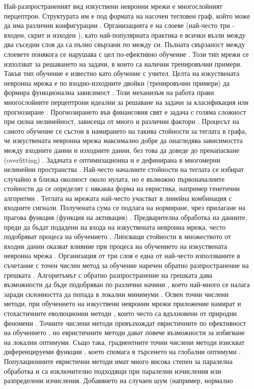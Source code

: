 Най-разпространеният вид изкуствени невронни мрежи е многослойният перцептрон. Структурата им е под формата на насочен тегловен граф, който може да има различни конфигурации \cite{da-Silva-01}. Организацията е на слоеве \cite{Jain-02} (най-често три - входен, скрит и изходен \cite{Pradhan-01}), като най-популярната практика е всички възли между два съседни слоя да са пълно свързани по между си. Пълната свързаност между слоевете понякога се нарушава с цел по-ефективно обучение \cite{Mocanu-01}. Този тип мрежи се използват за решаването на задачи, в които са налични тренировъчни примери. Такъв тип обучение е известно като обучение с учител. Целта на изкуствената невронна мрежа е по входно-изходните двойки (тренировъчни примери) да формира функционална зависимост \cite{Kattan-01}. Този механизъм на работа прави многослойните перцептрони идеални за решаване на задачи за класификация \cite{Kubat-01} или прогнозиране \cite{Basheer-01}. Прогнозирането във финансовия свят е задача с голяма сложност при силна нелинейност, зависеща от много и различни фактори \cite{Bing-01}. Процесът на самото обучение се състои в намирането на такива стойности за теглата в графа, че изкуствената невронна мрежа максимално добре да онагледява зависимостта между входните данни и изходните данни, без това да доведе до пренапасване (overfitting) \cite{Bilbao-01}. Задачата е оптимизационна и е дефинирана в многомерни нелинейни пространства \cite{Kingston-01}. Най-често началните стойности на теглата се избират случайно в близка околност около нулата, но е възможно първоначалните стойности да се определят с някаква форма на евристика, например генетични алгоритми \cite{Chandwani-01}. Теглата на мрежата най-често участват в линейна комбинация с входните сигнали. Получената сума се подлага на нормиране, чрез прилагане на прагова функция (функция на активация) \cite{Ertugrul-01}. Предварителна обработка на данните, преди да бъдат подадени на входа на изкуствената невронна мрежа, често подобряват процеса на обучението \cite{Nawi-01}. Липсващи стойности в множеството от входни данни оказват влияние при процеса на обучението на изкуствената невронна мрежа \cite{Viharos-01}. Организация от три слоя е една от най-често използваните в съчетание с точен числен метод за обучение наречен обратно разпространение на грешката \cite{Pomerleau-01}. Алгоритъмът с обратно разпространение на грешката дава възможности да бъде подобряван по различни начини \cite{Kollias-01}, което най-много се налага заради склонността да попада в локални минимуми \cite{Chen-02}. Освен точни числени методи, при обучението на изкуствени невронни мрежи приложение намират и стохастичните еволюционни методи \cite{Slowik-01}, които често са вдъхновени от природни феномени \cite{Cui-01}. Точните числени методи превъзхождат евристичните по ефективност на обучението \cite{Piotrowski-01}, но евристичните методи дават повече възможности за избягване на локални оптимуми. Също така, градиентните точни числени методи изискват диференцируеми функции \cite{Karaboga-01}, което спомага в търсенето на глобални оптимуми \cite{Roy-01}. Популационните евристични методи имат много висока степен за паралелна обработка и са изключително подходящи при паралелни изчисления \cite{Ding-01} или разпределени изчисления. Добавянето на случаен шум (например, нормално 